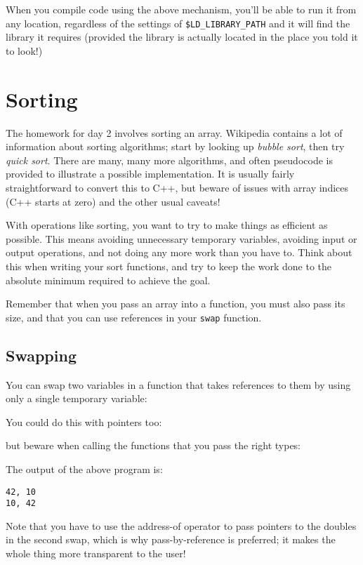 \documentclass[a4paper]{scrartcl}
\begin{document}
When you compile code using the above mechanism, you'll be able to run it from any location, regardless of the settings of \verb|$LD_LIBRARY_PATH| and it will find the library it requires (provided the library is actually located in the place you told it to look!)

\section{Sorting}
The homework for day 2 involves sorting an array. Wikipedia contains a lot of information about sorting algorithms; start by looking up \emph{bubble sort}, then try \emph{quick sort}. There are many, many more algorithms, and often pseudocode is provided to illustrate a possible implementation. It is usually fairly straightforward to convert this to C++, but beware of issues with array indices (C++ starts at zero) and the other usual caveats!

With operations like sorting, you want to try to make things as efficient as possible. This means avoiding unnecessary temporary variables, avoiding input or output operations, and not doing any more work than you have to. Think about this when writing your sort functions, and try to keep the work done to the absolute minimum required to achieve the goal.

Remember that when you pass an array into a function, you must also pass its size, and that you can use references in your \verb|swap| function.

\subsection{Swapping}
You can swap two variables in a function that takes references to them by using only a single temporary variable:



You could do this with pointers too:



but beware when calling the functions that you pass the right types:



The output of the above program is:
\begin{verbatim}
42, 10
10, 42
\end{verbatim}

Note that you have to use the address-of operator to pass pointers to the doubles in the second swap, which is why pass-by-reference is preferred; it makes the whole thing more transparent to the user!
\end{document}
